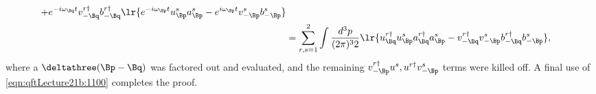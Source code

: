 {\begin{equation}
\begin{aligned}
{+
   e^{-i \omega_\Bq t }
   v^{r \dagger}_{-\Bq} b_{-\Bq}^{r \dagger}
}
\lr{
   e^{-i \omega_\Bp t }
   u^s_\Bp a_\Bp^s
-
   e^{i \omega_\Bp t }
   v^s_{-\Bp} b_{-\Bp}^s
} \\
&=
\sum_{r,s = 1}^2
\int \frac{d^3 p }{(2 \pi)^3 2 }
\lr{
   u^{r \dagger}_\Bq
   u^s_\Bp
   a_\Bq^{r \dagger}
   a_\Bp^s
-
   v^{r \dagger}_{-\Bq}
   v^s_{-\Bp}
   b_{-\Bq}^{r \dagger}
   b_{-\Bp}^s
},
\end{aligned}
\end{equation}
where a \( \deltathree(\Bp-\Bq) \) was factored out and evaluated, and the remaining \( v^{r\dagger}_{-\Bp} u^s, u^{r \dagger} v^s_{-\Bp} \) terms were killed off.
A final use of \cref{eqn:qftLecture21b:1100} completes the proof.
} %
